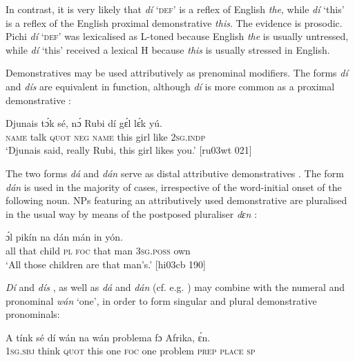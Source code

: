 In contrast, it is very likely that \textit{dí} ‘\textsc{def’} is a reflex of English \textit{the}, while \textit{dí} ‘this’ is a reflex of the English proximal demonstrative \textit{this}. The evidence is prosodic. Pichi \textit{dí} ‘\textsc{def}’ was lexicalised as L-toned because English \textit{the} is usually untressed, while \textit{dí} ‘this’ received a lexical H because \textit{this} is usually stressed in English. 



Demonstratives may be used attributively as prenominal modifiers. The forms \textit{dí} and\textit{ dís} are equivalent in function, although \textit{dí} is more common as a proximal demonstrative :



\ea%
    \label{ex:key:192}
    \gll Djunais  tɔ́k  sé,    nɔ́  Rubi    dí  gɛ́l  lɛ́k  yú.\\
\textsc{name}  talk  \textsc{quot}    \textsc{neg}  \textsc{name}  this  girl  like  \textsc{2sg.indp}\\

\glt ‘Djunais said, really Rubi, this girl likes you.’ [ru03wt 021]
\z

The two forms \textit{dá} and \textit{dán} serve as distal attributive demonstratives . The form \textit{dán} is used in the majority of cases, irrespective of the word-initial onset of the following noun. NPs featuring an attributively used demonstrative are pluralised in the usual way by means of the postposed pluraliser \textit{dɛn} :


\ea%
    \label{ex:key:193}
    \gll ɔ́l    pikín    na  dán  mán    in    yón.\\
all  that  child  \textsc{pl}  \textsc{foc}  that  man    \textsc{3sg.poss}  own\\

\glt ‘All those children are that man’s.’ [hi03cb 190]
\z

\textit{Dí} and \textit{dís} , as well as \textit{dá} and \textit{dán} (cf. e.g. ) may combine with the numeral and pronominal \textit{wán} ‘one’, in order to form singular  and plural  demonstrative pronominals:


\ea%
    \label{ex:key:194}
    \gll A    tínk    sé    dí  wán  na  wán  problema  fɔ  Afrika,  ɛ́n.\\
\textsc{1sg.sbj}  think  \textsc{quot}    this  one  \textsc{foc}  one  problem    \textsc{prep}  \textsc{place}  \textsc{sp}\\

